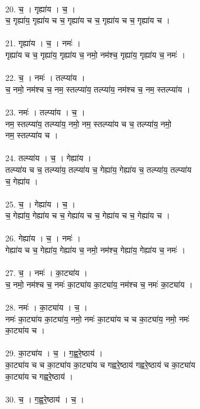 \\
20. च॒ । गृह्या॑य । च॒ ।\\
च॒ गृह्या॑य॒ गृह्या॑य च च॒ गृह्या॑य च च॒ गृह्या॑य च च॒ गृह्या॑य च ।\\
\\
21. गृह्या॑य । च॒ । नमः॑ ।\\
गृह्या॑य च च॒ गृह्या॑य॒ गृह्या॑य च॒ नमो॒ नम॑श्च॒ गृह्या॑य॒ गृह्या॑य च॒ नमः॑ ।\\
\\
22. च॒ । नमः॑ । तल्प्या॑य ।\\
च॒ नमो॒ नम॑श्च च॒ नम॒ स्तल्प्या॑य॒ तल्प्या॑य॒ नम॑श्च च॒ नम॒ स्तल्प्या॑य ।\\
\\
23. नमः॑ । तल्प्या॑य । च॒ ।\\
नम॒ स्तल्प्या॑य॒ तल्प्या॑य॒ नमो॒ नम॒ स्तल्प्या॑य च च॒ तल्प्या॑य॒ नमो॒\\
नम॒ स्तल्प्या॑य च ।\\
\\
24. तल्प्या॑य । च॒ । गेह्या॑य ।\\
तल्प्या॑य च च॒ तल्प्या॑य॒ तल्प्या॑य च॒ गेह्या॑य॒ गेह्या॑य च॒ तल्प्या॑य॒ तल्प्या॑य\\
च॒ गेह्या॑य ।\\
\\
25. च॒ । गेह्या॑य । च॒ ।\\
च॒ गेह्या॑य॒ गेह्या॑य च च॒ गेह्या॑य च च॒ गेह्या॑य च च॒ गेह्या॑य च ।\\
\\
26. गेह्या॑य । च॒ । नमः॑ ।\\
गेह्या॑य च च॒ गेह्या॑य॒ गेह्या॑य च॒ नमो॒ नम॑श्च॒ गेह्या॑य॒ गेह्या॑य च॒ नमः॑ ।\\
\\
27. च॒ । नमः॑ । का॒ट्या॑य ।\\
च॒ नमो॒ नम॑श्च च॒ नमः॑ का॒ट्या॑य का॒ट्या॑य॒ नम॑श्च च॒ नमः॑ का॒ट्या॑य ।\\
\\
28. नमः॑ । का॒ट्या॑य । च॒ ।\\
नमः॑ का॒ट्या॑य का॒ट्या॑य॒ नमो॒ नमः॑ का॒ट्या॑य च च का॒ट्या॑य॒ नमो॒ नमः॑\\
का॒ट्या॑य च ।\\
\\
29. का॒ट्या॑य । च॒ । ग॒ह्व॒रे॒ष्ठाय॑ ।\\
का॒ट्या॑य च च का॒ट्या॑य का॒ट्या॑य च गह्वरे॒ष्ठाय॑ गह्वरे॒ष्ठाय॑ च का॒ट्या॑य\\
का॒ट्या॑य च गह्वरे॒ष्ठाय॑ ।\\
\\
30. च॒ । ग॒ह्व॒रे॒ष्ठाय॑ । च॒ ।\\
